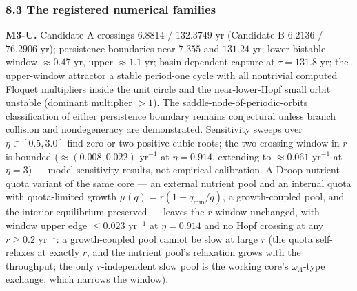 \documentclass[11pt]{article}
\begin{document}
\subsubsection{8.3 The registered numerical
families}\label{the-registered-numerical-families}

\textbf{M3-U.} Candidate A crossings \(6.8814\) / \(132.3749\) yr
(Candidate B \(6.2136\) / \(76.2906\) yr); persistence boundaries near
\(7.355\) and \(131.24\) yr; lower bistable window \(\approx0.47\) yr,
upper \(\approx1.1\) yr; basin-dependent capture at \(\tau = 131.8\) yr;
the upper-window attractor a stable period-one cycle with all nontrivial
computed Floquet multipliers inside the unit circle and the
near-lower-Hopf small orbit unstable (dominant multiplier \(>1\)). The
saddle-node-of-periodic-orbits classification of either persistence
boundary remains conjectural unless branch collision and nondegeneracy
are demonstrated. Sensitivity sweeps over \(\eta \in [0.5, 3.0]\) find
zero or two positive cubic roots; the two-crossing window in \(r\) is
bounded (\(\approx(0.008, 0.022)\) yr\(^{-1}\) at \(\eta = 0.914\),
extending to \(\approx0.061\) yr\(^{-1}\) at \(\eta = 3\)) --- model
sensitivity results, not empirical calibration. A Droop nutrient--quota
variant of the same core --- an external nutrient pool and an internal
quota with quota-limited growth \(\mu(q) = r(1 - q_{\min}/q)\), a
growth-coupled pool, and the interior equilibrium preserved --- leaves
the \(r\)-window unchanged, with window upper edge \(\le 0.023\)
yr\(^{-1}\) at \(\eta = 0.914\) and no Hopf crossing at any
\(r \ge 0.2\) yr\(^{-1}\): a growth-coupled pool cannot be slow at large
\(r\) (the quota self-relaxes at exactly \(r\), and the nutrient pool's
relaxation grows with the throughput; the only \(r\)-independent slow
pool is the working core's \(\omega_A\)-type exchange, which narrows the
window).
\end{document}
